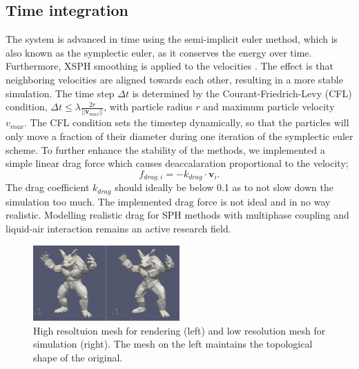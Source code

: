 \documentclass[11pt, letterpaper, twocolumn]{article}
\begin{document}
\subsection{Time integration}
The system is advanced in time using the semi-implicit euler method, which is also known as the symplectic euler, as it conserves the energy over time.
Furthermore, XSPH smoothing is applied to the velocities \cite{monaghan1989}.
The effect is that neighboring velocities are aligned towards each other, resulting in a more stable simulation.
The time step \(\Delta t\) is determined by the Courant-Friedrich-Levy (CFL) condition, \( \Delta t \leq \lambda \frac{2r}{||\mathbf{v}_{max}||}\), with particle radius \(r\) and maximum particle velocity \(v_{max}\). The CFL condition sets the timestep dynamically, so that the particles will only move a fraction of their diameter during one iteration of the symplectic euler scheme. 
To further enhance the stability of the methods, we implemented a simple linear drag force which causes deaccalaration proportional to the velocity;
\begin{equation}
  f_{drag,i} = -k_{drag} \cdot \mathbf{v}_i.
\end{equation}
The drag coefficient \(k_{drag}\) should ideally be below 0.1 as to not slow down the simulation too much. The implemented drag force is not ideal and in no way realistic. Modelling realistic drag for SPH methods with multiphase coupling and liquid-air interaction remains an active research field.

\begin{figure}[ht]
  \centering
  \includegraphics[width=0.5\textwidth]{images/mesh.png}
  \caption{High resoltuion mesh for rendering (left) and low resolution mesh for simulation (right). The mesh on the left maintains the topological shape of the original.}
  \label{fig:mesh}
\end{figure}
\end{document}
